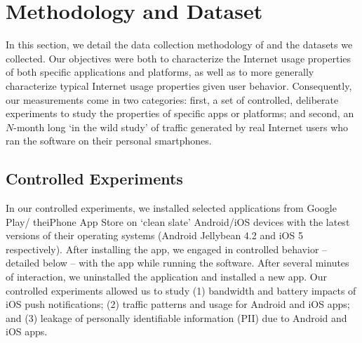 \section{Methodology and Dataset}
\label{sec:Methodology}

In this section, we detail the data collection methodology of \platname and the datasets we collected.
Our objectives were both to characterize the Internet usage properties of both specific applications and platforms, as well as to more generally characterize typical Internet usage properties given user behavior.
Consequently, our measurements come in two categories: first, a set of controlled, deliberate experiments to study the properties of specific apps or platforms; and second, an $N$-month long `in the wild study' of traffic generated by real Internet users who ran the \platname software on their personal smartphones.

\subsection{Controlled Experiments}
  In our controlled experiments, we installed selected applications from Google Play/ theiPhone App Store on `clean slate' Android/iOS devices with the latest versions of their operating systems (Android Jellybean 4.2 and iOS 5 respectively). 
  After installing the app, we engaged in controlled behavior -- detailed below -- with the app while running the \platname software. 
  After several minutes of interaction, we uninstalled the application and installed a new app.
  Our controlled experiments allowed us to study (1) bandwidth and battery impacts of iOS push notifications; (2) traffic patterns and usage for Android and iOS apps; and (3) leakage of personally identifiable information (PII) due to Android and iOS apps.

